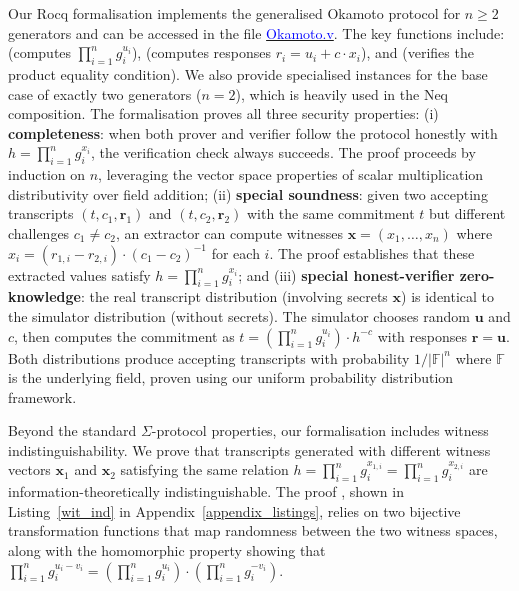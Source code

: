 Our Rocq formalisation implements the generalised Okamoto protocol for $n \geq 2$ generators and can be accessed in the file \href{https://anonymous.4open.science/r/SigmaProtocol-EBA5/src/Crypto/Okamoto.v}{\textcolor{blue}{Okamoto.v}}. The key functions include: \texttt{} (computes $\prod_{i=1}^{n} g_i^{u_i}$), \texttt{} (computes responses $r_i = u_i + c \cdot x_i$), and
\texttt{} (verifies the product equality condition). We also provide specialised instances for the base case of exactly two generators ($n=2$), which is heavily used in the Neq composition. The formalisation proves all three security properties: (i) \textbf{completeness}:
when both prover and verifier follow the protocol honestly with $h = \prod_{i=1}^{n} g_i^{x_i}$,
the verification check always succeeds. The proof proceeds by induction on $n$, leveraging the
vector space properties of scalar multiplication distributivity over field addition; (ii) \textbf{special soundness}:
given two accepting transcripts $(t, c_1, \mathbf{r}_1)$ and $(t, c_2, \mathbf{r}_2)$ with
the same commitment $t$ but different challenges $c_1 \neq c_2$, an extractor can compute
witnesses $\mathbf{x} = (x_1, \ldots, x_n)$ where
$x_i = (r_{1,i} - r_{2,i}) \cdot (c_1 - c_2)^{-1}$ for each $i$. The proof establishes that
these extracted values satisfy $h = \prod_{i=1}^{n} g_i^{x_i}$; and (iii) \textbf{special honest-verifier zero-knowledge}:
the real transcript distribution (involving secrets $\mathbf{x}$) is identical to the simulator
distribution (without secrets). The simulator chooses random $\mathbf{u}$ and $c$, then computes
the commitment as $t = \left(\prod_{i=1}^{n} g_i^{u_i}\right) \cdot h^{-c}$ with responses
$\mathbf{r} = \mathbf{u}$. Both distributions produce accepting transcripts with probability
$1/|\mathbb{F}|^n$ where $\mathbb{F}$ is the underlying field, proven using our uniform probability
distribution framework.

Beyond the standard $\Sigma$-protocol properties, our formalisation includes witness indistinguishability. We prove that transcripts generated with different witness
vectors $\mathbf{x}_1$ and $\mathbf{x}_2$ satisfying the same relation $h = \prod_{i=1}^{n} g_i^{x_{1,i}} =
\prod_{i=1}^{n} g_i^{x_{2,i}}$ are information-theoretically indistinguishable. The proof \texttt{}, shown in Listing~\ref{wit_ind} in Appendix~\ref{appendix_listings}, relies on two
bijective transformation functions that map
randomness between the two witness spaces, along with the homomorphic property showing that
$\prod_{i=1}^{n} g_i^{u_i - v_i} = \left(\prod_{i=1}^{n} g_i^{u_i}\right) \cdot
\left(\prod_{i=1}^{n} g_i^{-v_i}\right)$.

